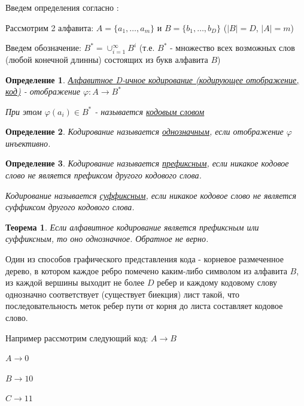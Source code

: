 \documentclass[14pt,a4paper,russian]{article}
\newtheorem{opr}{Определение}[section]
\newtheorem{teor}{Теорема}[section]
\begin{document}
Введем определения согласно \cite{Checheta}:

Рассмотрим 2 алфавита: $A = \{a_1, \ldots, a_m\}$ и $B = \{b_1, \ldots, b_D\}$ ($|B| = D$, $|A| = m$)

Введем обозначение: $B^* = \cup_{i=1}^{\infty} B^i$ (т.е. $B^*$ - множество всех возможных слов (любой конечной длинны) состоящих из букв алфавита $B$)

\begin{opr}
	\uline{Алфавитное D-ичное кодирование (кодирующее отображение, код)} - отображение $\varphi: A \rightarrow B^*$ 
	
	При этом $\varphi(a_i) \in B^*$ - называется \uline{кодовым словом}
\end{opr}
\begin{opr}
	Кодирование называется \uline{однозначным}, если отображение $\varphi$ инъективно.
\end{opr}
\begin{opr}
	Кодирование называется \uline{префиксным}, если никакое кодовое слово не является префиксом другого кодового слова.
	
	Кодирование называется \uline{суффиксным}, если никакое кодовое слово не является суффиксом другого кодового слова.
\end{opr}
\begin{teor}
	Если алфавитное кодирование является префиксным или суффиксным, то оно однозначное. Обратное не верно.
\end{teor}

Один из способов графического представления кода - корневое размеченное дерево, в котором каждое ребро помечено каким-либо символом из алфавита $B$, из каждой вершины выходит не более $D$ ребер и каждому кодовому слову однозначно соответствует (существует биекция) лист такой, что последовательность меток ребер пути от корня до листа составляет кодовое слово. 

Например рассмотрим следующий код:
$A \rightarrow B$

$A \rightarrow 0$

$B \rightarrow 10$

$C \rightarrow 11$
\end{document}
